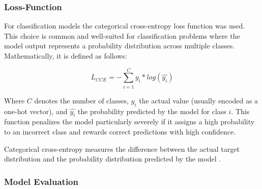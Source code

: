 \subsubsection{Loss-Function}

For classification models the categorical cross-entropy loss function was used.
This choice is common and well-suited for classification problems where the model output represents a probability distribution across multiple classes.
Mathematically, it is defined as follows:

\[
    L_{CCE} = -\sum_{i=1}^{C} y_i*log(\hat{y_i})
\]

Where $C$ denotes the number of classes, $y_i$ the actual value (usually encoded as a one-hot vector), and $\hat{y_i}$ the probability predicted by the model for class $i$.
This function penalizes the model particularly severely if it assigns a high probability to an incorrect class and rewards correct predictions with high confidence.

Categorical cross-entropy measures the difference between the actual target distribution and the probability distribution predicted by the model \cite{springer-ml-basics}.

\subsubsection{Model Evaluation}

